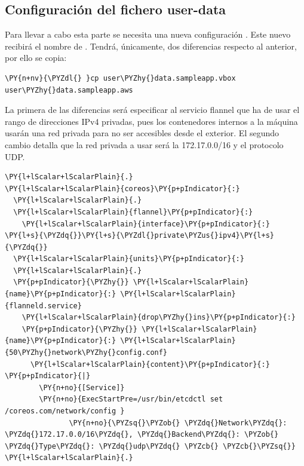 \subsection{Configuración del fichero user-data}

Para llevar a cabo esta parte se necesita una nueva configuración . Este nuevo  recibirá el nombre de . Tendrá, únicamente, dos diferencias respecto al anterior, por ello se copia:

\begin{framed_shaded}
\begin{Verbatim}[fontsize=\relsize{-2.5},fontseries=b,commandchars=\\\{\}]
\PY{n+nv}{\PYZdl{} }cp user\PYZhy{}data.sampleapp.vbox user\PYZhy{}data.sampleapp.aws
\end{Verbatim}
\end{framed_shaded}

La primera de las diferencias será especificar al servicio flannel que ha de usar el rango de direcciones IPv4 privadas, pues los contenedores internos a la máquina usarán una red privada para no ser accesibles desde el exterior. El segundo cambio detalla que la red privada a usar será la 172.17.0.0/16 y el protocolo UDP.

\begin{codelisting}
\label{code:vagrantfile2}
\begin{Verbatim}[fontsize=\relsize{-2.5},fontseries=b,commandchars=\\\{\}]
\PY{l+lScalar+lScalarPlain}{.}
\PY{l+lScalar+lScalarPlain}{coreos}\PY{p+pIndicator}{:}
  \PY{l+lScalar+lScalarPlain}{.}
  \PY{l+lScalar+lScalarPlain}{flannel}\PY{p+pIndicator}{:}
    \PY{l+lScalar+lScalarPlain}{interface}\PY{p+pIndicator}{:} \PY{l+s}{\PYZdq{}}\PY{l+s}{\PYZdl{}private\PYZus{}ipv4}\PY{l+s}{\PYZdq{}}
  \PY{l+lScalar+lScalarPlain}{units}\PY{p+pIndicator}{:}
  \PY{l+lScalar+lScalarPlain}{.}
  \PY{p+pIndicator}{\PYZhy{}} \PY{l+lScalar+lScalarPlain}{name}\PY{p+pIndicator}{:} \PY{l+lScalar+lScalarPlain}{flanneld.service}
    \PY{l+lScalar+lScalarPlain}{drop\PYZhy{}ins}\PY{p+pIndicator}{:}
    \PY{p+pIndicator}{\PYZhy{}} \PY{l+lScalar+lScalarPlain}{name}\PY{p+pIndicator}{:} \PY{l+lScalar+lScalarPlain}{50\PYZhy{}network\PYZhy{}config.conf}
      \PY{l+lScalar+lScalarPlain}{content}\PY{p+pIndicator}{:} \PY{p+pIndicator}{|}
        \PY{n+no}{[Service]}
        \PY{n+no}{ExecStartPre=/usr/bin/etcdctl set /coreos.com/network/config }
               \PY{n+no}{\PYZsq{}\PYZob{} \PYZdq{}Network\PYZdq{}: \PYZdq{}172.17.0.0/16\PYZdq{}, \PYZdq{}Backend\PYZdq{}: \PYZob{} \PYZdq{}Type\PYZdq{}: \PYZdq{}udp\PYZdq{} \PYZcb{} \PYZcb{}\PYZsq{}}
\PY{l+lScalar+lScalarPlain}{.}
\end{Verbatim}
\end{codelisting}

